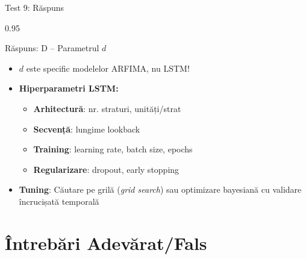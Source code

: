 \documentclass[9pt, aspectratio=169, t]{beamer}
\begin{document}
\begin{frame}{Test 9: Răspuns}
    \begin{cminipage}{0.95\textwidth}
    \begin{exampleblock}{Răspuns: D -- Parametrul $d$}
        \begin{itemize}\setlength{\itemsep}{0pt}
            \item $d$ este specific modelelor ARFIMA, nu LSTM!
            \item \textbf{Hiperparametri LSTM:}
            \begin{itemize}\setlength{\itemsep}{0pt}
                \item \textbf{Arhitectură}: nr. straturi, unități/strat
                \item \textbf{Secvență}: lungime lookback
                \item \textbf{Training}: learning rate, batch size, epochs
                \item \textbf{Regularizare}: dropout, early stopping
            \end{itemize}
            \item \textbf{Tuning}: Căutare pe grilă (\emph{grid search}) sau optimizare bayesiană cu validare încrucișată temporală
        \end{itemize}
    \end{exampleblock}
    \end{cminipage}
\end{frame}

\section{Întrebări Adevărat/Fals}
\end{document}
